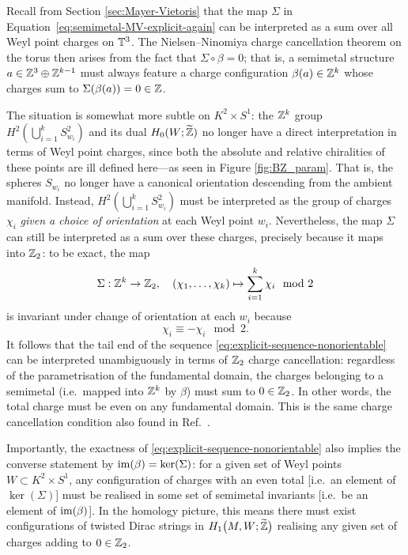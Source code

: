 Recall from Section \ref{sec:Mayer-Vietoris} that the map $\Sigma$ in Equation~\eqref{eq:semimetal-MV-explicit-again} can be interpreted as a sum over all Weyl point charges on $\mathbb{T}^3$. The Nielsen--Ninomiya charge cancellation theorem on the torus then arises from the fact that $\Sigma\circ\beta = 0$; that is, a semimetal structure $a\in\mathbb{Z}^3\oplus\mathbb{Z}^{k-1}$ must always feature a charge configuration $\beta(a)\in\mathbb{Z}^k$ whose charges sum to $\Sigma(\beta(a)) = 0 \in \mathbb{Z}$.

The situation is somewhat more subtle on $K^2\times S^1$: the $\mathbb{Z}^k$ group $H^2\!\left(\bigcup_{i=1}^k S_{w_i}^2\right)$ and its dual $H_0(W;\widetilde{\mathbb{Z}})$ no longer have a direct interpretation in terms of Weyl point charges, since both the absolute and relative chiralities of these points are ill defined here---as seen in Figure \ref{fig:BZ_param}. That is, the spheres $S_{w_i}$ no longer have a canonical orientation descending from the ambient manifold. Instead, $H^2\!\left(\bigcup_{i=1}^k S_{w_i}^2\right)$ must be interpreted as the group of charges $\chi_i$ \emph{given a choice of orientation} at each Weyl point $w_i$. Nevertheless, the map $\Sigma$ can still be interpreted as a sum over these charges, precisely because it maps into $\mathbb{Z}_2$: to be exact, the map
\begin{equation}\label{eq:map-sigma}
	\Sigma: \mathbb{Z}^k\to\mathbb{Z}_2,\quad (\chi_1,\ldots,\chi_k) \mapsto \sum_{i=1}^{k}\chi_i \mod 2
\end{equation}
is invariant under change of orientation at each $w_i$ because
\begin{equation*}
	\chi_i \equiv -\chi_i \mod 2.
\end{equation*}
It follows that the tail end of the sequence \eqref{eq:explicit-sequence-nonorientable} can be interpreted unambiguously in terms of $\mathbb{Z}_2$ charge cancellation: regardless of the parametrisation of the fundamental domain, the charges belonging to a semimetal (i.e.\ mapped into $\mathbb{Z}^k$ by $\beta$) must sum to $0\in\mathbb{Z}_2$. In other words, the total charge must be even on any fundamental domain. This is the same charge cancellation condition also found in Ref.~\cite{Fonseca-Vaidya_nonorientable}.

Importantly, the exactness of \eqref{eq:explicit-sequence-nonorientable} also implies the converse statement by $\operatorname{im}(\beta) = \ker(\Sigma)$: for a given set of Weyl points $W\subset K^2\times S^1$, any configuration of charges with an even total [i.e.\ an element of $\ker(\Sigma)$] must be realised in some set of semimetal invariants [i.e.\ be an element of $\operatorname{im}(\beta)$]. In the homology picture, this means there must exist configurations of twisted Dirac strings in $H_1\big(M, W;\widetilde{\mathbb{Z}}\big)$ realising any given set of charges adding to $0\in\mathbb{Z}_2$.


